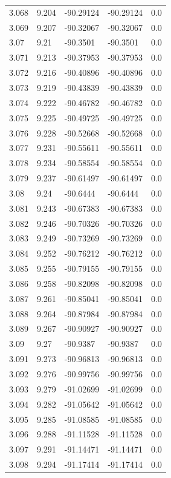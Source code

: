 \begin{tabular}{lllll}
3.068 & 9.204 & -90.29124 & -90.29124 & 0.0 \\
3.069 & 9.207 & -90.32067 & -90.32067 & 0.0 \\
3.07 & 9.21 & -90.3501 & -90.3501 & 0.0 \\
3.071 & 9.213 & -90.37953 & -90.37953 & 0.0 \\
3.072 & 9.216 & -90.40896 & -90.40896 & 0.0 \\
3.073 & 9.219 & -90.43839 & -90.43839 & 0.0 \\
3.074 & 9.222 & -90.46782 & -90.46782 & 0.0 \\
3.075 & 9.225 & -90.49725 & -90.49725 & 0.0 \\
3.076 & 9.228 & -90.52668 & -90.52668 & 0.0 \\
3.077 & 9.231 & -90.55611 & -90.55611 & 0.0 \\
3.078 & 9.234 & -90.58554 & -90.58554 & 0.0 \\
3.079 & 9.237 & -90.61497 & -90.61497 & 0.0 \\
3.08 & 9.24 & -90.6444 & -90.6444 & 0.0 \\
3.081 & 9.243 & -90.67383 & -90.67383 & 0.0 \\
3.082 & 9.246 & -90.70326 & -90.70326 & 0.0 \\
3.083 & 9.249 & -90.73269 & -90.73269 & 0.0 \\
3.084 & 9.252 & -90.76212 & -90.76212 & 0.0 \\
3.085 & 9.255 & -90.79155 & -90.79155 & 0.0 \\
3.086 & 9.258 & -90.82098 & -90.82098 & 0.0 \\
3.087 & 9.261 & -90.85041 & -90.85041 & 0.0 \\
3.088 & 9.264 & -90.87984 & -90.87984 & 0.0 \\
3.089 & 9.267 & -90.90927 & -90.90927 & 0.0 \\
3.09 & 9.27 & -90.9387 & -90.9387 & 0.0 \\
3.091 & 9.273 & -90.96813 & -90.96813 & 0.0 \\
3.092 & 9.276 & -90.99756 & -90.99756 & 0.0 \\
3.093 & 9.279 & -91.02699 & -91.02699 & 0.0 \\
3.094 & 9.282 & -91.05642 & -91.05642 & 0.0 \\
3.095 & 9.285 & -91.08585 & -91.08585 & 0.0 \\
3.096 & 9.288 & -91.11528 & -91.11528 & 0.0 \\
3.097 & 9.291 & -91.14471 & -91.14471 & 0.0 \\
3.098 & 9.294 & -91.17414 & -91.17414 & 0.0 \\

\end{tabular}
